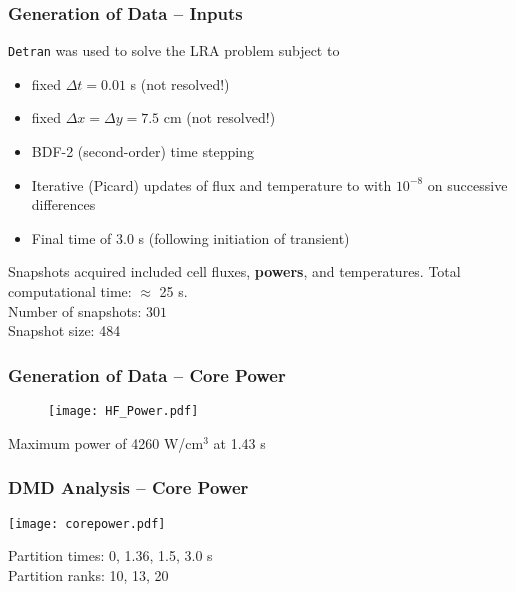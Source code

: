 \documentclass[fleqn]{beamer}
\begin{document}
\begin{frame}
\frametitle{Generation of Data -- Inputs}

{\tt Detran} was used to solve the LRA problem subject to
\begin{itemize}
  \item fixed $\Delta t = 0.01$ s (not resolved!)
  \item fixed $\Delta x = \Delta y = 7.5$ cm (not resolved!)
  \item BDF-2 (second-order) time stepping
  \item Iterative (Picard) updates of flux and temperature to with $10^{-8}$ on successive differences
  \item Final time of 3.0 s (following initiation of transient)
\end{itemize}
\vfill
Snapshots acquired included cell fluxes, {\bf powers}, and temperatures.
\vfill 
Total computational time: $\approx$ 25 s. \\
Number of snapshots: $301$\\
Snapshot size: 484 
\vfill 

\end{frame}

\begin{frame}
\frametitle{Generation of Data -- Core Power}

\begin{figure}[ht]
\texttt{[image: HF\_Power.pdf]}
\end{figure}
Maximum power of 4260 W/cm$^3$ at 1.43 s
\end{frame}



\begin{frame}
\frametitle{DMD Analysis -- Core Power}

\texttt{[image: corepower.pdf]}

Partition times: 0, 1.36, 1.5, 3.0 s\\
Partition ranks: 10, 13, 20

\end{frame}
\end{document}
